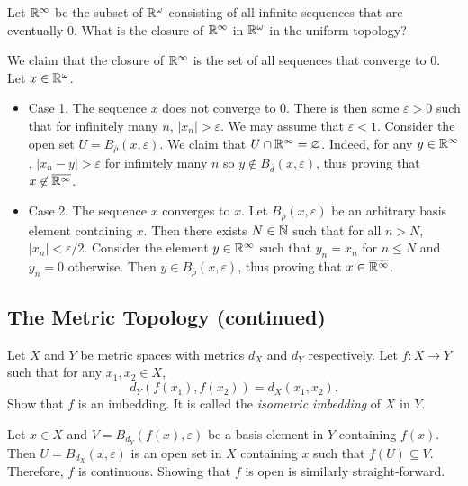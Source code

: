 	\setcounter{exercise}{4}
	\begin{exercise}
		Let $\mathbb{R}^\infty$ be the subset of $\mathbb{R}^\omega$ consisting of all infinite sequences that are eventually $0$. What is the closure of $\mathbb{R}^\infty$ in $\mathbb{R}^\omega$ in the uniform topology?
	\end{exercise}
	\begin{solution*}
		We claim that the closure of $\mathbb{R}^\infty$ is the set of all sequences that converge to $0$. Let $x\in\mathbb{R}^\omega$.
		\begin{itemize}
			\item Case 1. The sequence $x$ does not converge to $0$. There is then some $\varepsilon>0$ such that for infinitely many $n$, $|x_n|>\varepsilon$. We may assume that $\varepsilon<1$. Consider the open set $U = B_{\overline{\rho}}(x,\varepsilon)$. We claim that $U\cap\mathbb{R}^\infty = \varnothing$. Indeed, for any $y\in\mathbb{R}^\infty$, $|x_n-y|>\varepsilon$ for infinitely many $n$ so $y\not\in B_{\overline{d}}(x,\varepsilon)$, thus proving that $x\not\in\overline{\mathbb{R}^\infty}$.
			\item Case 2. The sequence $x$ converges to $x$. Let $B_{\overline{\rho}}(x,\varepsilon)$ be an arbitrary basis element containing $x$. Then there exists $N\in\mathbb{N}$ such that for all $n>N$, $|x_n|<\varepsilon/2$. Consider the element $y\in\mathbb{R}^\infty$ such that $y_n=x_n$ for $n\leq N$ and $y_n=0$ otherwise. Then $y\in B_{\overline{\rho}}(x,\varepsilon)$, thus proving that $x\in\overline{\mathbb{R}^\infty}$.
		\end{itemize}
	\end{solution*}

\subsection{The Metric Topology (continued)}

	\setcounter{exercise}{1}
	\begin{exercise}
		Let $X$ and $Y$ be metric spaces with metrics $d_X$ and $d_Y$ respectively. Let $f:X\to Y$ such that for any $x_1,x_2\in X$,
		\[ d_Y(f(x_1), f(x_2)) = d_X(x_1,x_2). \]
		Show that $f$ is an imbedding. It is called the \textit{isometric imbedding} of $X$ in $Y$.
	\end{exercise}
	\begin{solution*}
		Let $x\in X$ and $V = B_{d_Y}(f(x),\varepsilon)$ be a basis element in $Y$ containing $f(x)$. Then $U = B_{d_X}(x,\varepsilon)$ is an open set in $X$ containing $x$ such that $f(U)\subseteq V$. Therefore, $f$ is continuous. Showing that $f$ is open is similarly straight-forward.
	\end{solution*}

